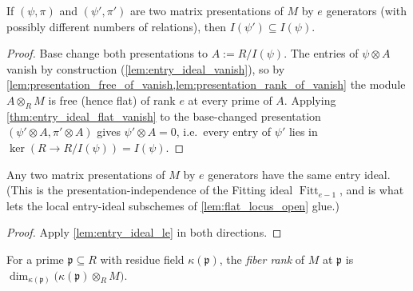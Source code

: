 \begin{lemma}
  \label{lem:entry_ideal_le}
  \leanok
  If \((\psi, \pi)\) and \((\psi', \pi')\) are two matrix presentations of
  \(M\) by \(e\) generators (with possibly different numbers of relations),
  then \(I(\psi') \subseteq I(\psi)\).
\end{lemma}

\begin{proof}
  \leanok
  Base change both presentations to \(A := R / I(\psi)\).  The entries of
  \(\psi \otimes A\) vanish by construction
  (\cref{lem:entry_ideal_vanish}), so by
  \cref{lem:presentation_free_of_vanish,lem:presentation_rank_of_vanish}
  the module \(A \otimes_R M\) is free (hence flat) of rank \(e\) at every
  prime of \(A\).  Applying \cref{thm:entry_ideal_flat_vanish} to the
  base-changed presentation \((\psi' \otimes A, \pi' \otimes A)\) gives
  \(\psi' \otimes A = 0\), i.e.\ every entry of \(\psi'\) lies in
  \(\ker(R \to R/I(\psi)) = I(\psi)\).
\end{proof}

\begin{theorem}
  \label{thm:entry_ideal_presentation_independent}
  \leanok
  Any two matrix presentations of \(M\) by \(e\) generators have the same
  entry ideal.  (This is the presentation-independence of the Fitting ideal
  \(\operatorname{Fitt}_{e-1}\), and is what lets the local entry-ideal
  subschemes of \cref{lem:flat_locus_open} glue.)
\end{theorem}

\begin{proof}
  \leanok
  Apply \cref{lem:entry_ideal_le} in both directions.
\end{proof}

\begin{definition}
  \label{def:fiber_rank}
  \leanok
  For a prime \(\mathfrak p \subseteq R\) with residue field
  \(\kappa(\mathfrak p)\), the \emph{fiber rank} of \(M\) at
  \(\mathfrak p\) is
  \(\dim_{\kappa(\mathfrak p)} \bigl(\kappa(\mathfrak p) \otimes_R M\bigr)\).
\end{definition}

